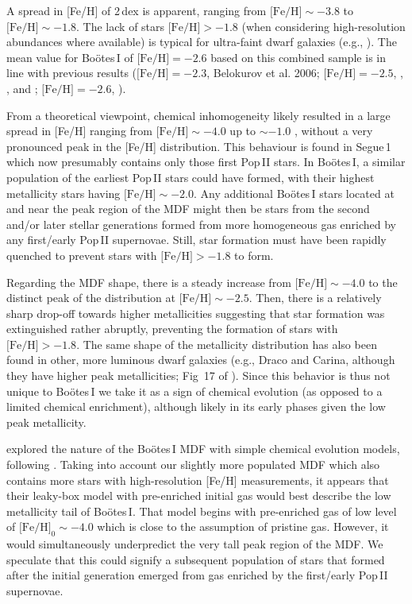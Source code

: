 \documentclass[]{emulateapj}
\begin{document}
A spread in [Fe/H] of 2\,dex is apparent, ranging from $\mbox{[Fe/H]}
\sim -3.8$ to $\mbox{[Fe/H]} \sim -1.8$. The lack of stars
$\mbox{[Fe/H]} > -1.8$ (when considering high-resolution abundances
where available) is typical for ultra-faint dwarf galaxies (e.g.,
\citealt{kirby08,ufs,frebel14}). The mean value for Bo\"otes\,I of
$\mbox{[Fe/H]} =-2.6$ based on this combined sample is in line with
previous results ($\mbox{[Fe/H]} =-2.3$, Belokurov et al. 2006;
$\mbox{[Fe/H]} =-2.5$, \citealt{munoz06}, \citealt{siegel06},
\citealt{martin07} and \citealt{norris_boo}; $\mbox{[Fe/H]} =-2.6$,
\citealt{lai11}).

From a theoretical viewpoint, chemical inhomogeneity likely resulted
in a large spread in [Fe/H] ranging from $\mbox{[Fe/H]} \sim-4.0$ up
to $\sim-1.0$ \citep{greif11}, without a very pronounced peak in the
[Fe/H] distribution. This behaviour is found in Segue\,1
\citep{frebel14} which now presumably contains only those first
Pop\,II stars.  In Bo\"otes\,I, a similar population of the earliest
Pop\,II stars could have formed, with their highest metallicity stars
having $\mbox{[Fe/H]} \sim-2.0$. Any additional Bo\"otes\,I stars
located at and near the peak region of the MDF might then be stars
from the second and/or later stellar generations formed from more
homogeneous gas enriched by any first/early Pop\,II supernovae. Still,
star formation must have been rapidly quenched to prevent stars with
$\mbox{[Fe/H]} >-1.8$ to form.

Regarding the MDF shape, there is a steady increase from
$\mbox{[Fe/H]} \sim -4.0$ to the distinct peak of the distribution at
$\mbox{[Fe/H]} \sim -2.5$. Then, there is a relatively sharp drop-off
towards higher metallicities suggesting that star formation was
extinguished rather abruptly, preventing the formation of stars with
$\mbox{[Fe/H]} >-1.8$. The same shape of the metallicity distribution
has also been found in other, more luminous dwarf galaxies (e.g.,
Draco and Carina, although they have higher peak metallicities; Fig~17
of \citealt{norris10}). Since this behavior is thus not unique to
Bo\"otes\,I we take it as a sign of chemical evolution (as opposed to
a limited chemical enrichment), although likely in its early phases given
the low peak metallicity.



\citet{lai11} explored the nature of the Bo\"otes\,I MDF with simple
chemical evolution models, following \citet{kirby11}. Taking into
account our slightly more populated MDF which also contains more stars
with high-resolution [Fe/H] measurements, it appears that their
leaky-box model with pre-enriched initial gas would best describe the
low metallicity tail of Bo\"otes\,I. That model begins with
pre-enriched  gas of low level of $\mbox{[Fe/H]}_{0}
\sim-4.0$ which is close to the assumption of pristine gas. However,
it would simultaneously underpredict the very tall peak region
of the MDF. We speculate that this could signify a subsequent
population of stars that formed after the initial generation emerged
from gas enriched by the first/early Pop\,II supernovae. 
\end{document}
